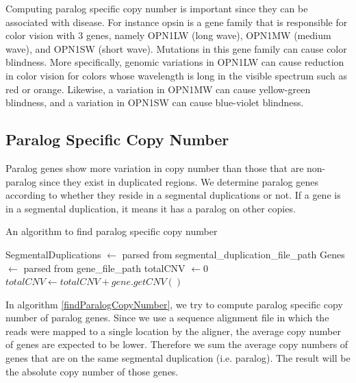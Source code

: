 Computing paralog specific copy number is important since they can be associated with disease. For instance opsin is a gene family that is responsible for color vision with 3 genes, namely OPN1LW (long wave), OPN1MW (medium wave), and OPN1SW (short wave). Mutations in this gene family can cause color blindness. More specifically, genomic variations in OPN1LW can cause reduction in color vision for colors whose wavelength is long in the visible spectrum such as red or orange. Likewise, a variation in OPN1MW can cause yellow-green blindness, and a variation in OPN1SW can cause blue-violet blindness.

\subsection{Paralog Specific Copy Number}
Paralog genes show more variation in copy number than those that are non-paralog since they exist in duplicated regions. We determine paralog genes according to whether they reside in a segmental duplications or not. If a gene is in a segmental duplication, it means it has a paralog on other copies.

\begin{algorithm}
\caption{An algorithm to find paralog specific copy number}
\label{findParalogCopyNumber}
\begin{algorithmic}[1]
\State SegmentalDuplications $\gets$ parsed from segmental\_duplication\_file\_path
\State Genes $\gets$ parsed from gene\_file\_path
\State totalCNV $\gets 0$
\State $totalCNV \gets totalCNV + gene.getCNV()$
\EndIf
\EndFor
\EndFor
\EndProcedure
\end{algorithmic}
\end{algorithm}

In algorithm \ref{findParalogCopyNumber}, we try to compute paralog specific copy number of paralog genes. Since we use a sequence alignment file in which the reads were mapped to a single location by the aligner, the average copy number of genes are expected to be lower. Therefore we sum the average copy numbers of genes that are on the same segmental duplication (i.e. paralog). The result will be the absolute copy number of those genes.